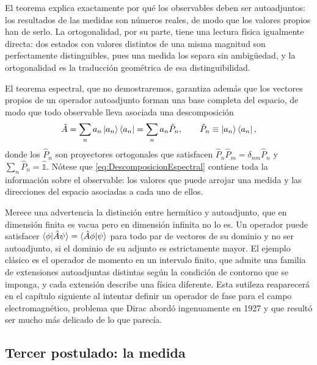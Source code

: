         El teorema explica exactamente por qué los observables deben ser autoadjuntos: los resultados de las medidas son números reales, de modo que los valores propios han de serlo. La ortogonalidad, por su parte, tiene una lectura física igualmente directa: dos estados con valores distintos de una misma magnitud son perfectamente distinguibles, pues una medida los separa sin ambigüedad, y la ortogonalidad es la traducción geométrica de esa distinguibilidad.

        El teorema espectral, que no demostraremos, garantiza además que los vectores propios de un operador autoadjunto forman una base completa del espacio, de modo que todo observable lleva asociada una descomposición
        \begin{equation}\label{eq:DescomposicionEspectral}
            \hat{A} = \sum_{n} a_{n}\ket{a_{n}}\bra{a_{n}} = \sum_{n} a_{n}\hat{P}_{n},
            \qquad
            \hat{P}_{n} \equiv \ket{a_{n}}\bra{a_{n}},
        \end{equation}
        donde los $\hat{P}_{n}$ son proyectores ortogonales que satisfacen $\hat{P}_{n}\hat{P}_{m} = \delta_{nm}\hat{P}_{n}$ y $\sum_{n}\hat{P}_{n} = \hat{\mathbb{1}}$. Nótese que \eqref{eq:DescomposicionEspectral} contiene toda la información sobre el observable: los valores que puede arrojar una medida y las direcciones del espacio asociadas a cada uno de ellos.

        Merece una advertencia la distinción entre hermítico y autoadjunto, que en dimensión finita es vacua pero en dimensión infinita no lo es. Un operador puede satisfacer $\braket{\phi|\hat{A}\psi} = \braket{\hat{A}\phi|\psi}$ para todo par de vectores de su dominio y no ser autoadjunto, si el dominio de su adjunto es estrictamente mayor. El ejemplo clásico es el operador de momento en un intervalo finito, que admite una familia de extensiones autoadjuntas distintas según la condición de contorno que se imponga, y cada extensión describe una física diferente. Esta sutileza reaparecerá en el capítulo siguiente al intentar definir un operador de fase para el campo electromagnético, problema que Dirac abordó ingenuamente en 1927 y que resultó ser mucho más delicado de lo que parecía.

    \subsection{Tercer postulado: la medida}

